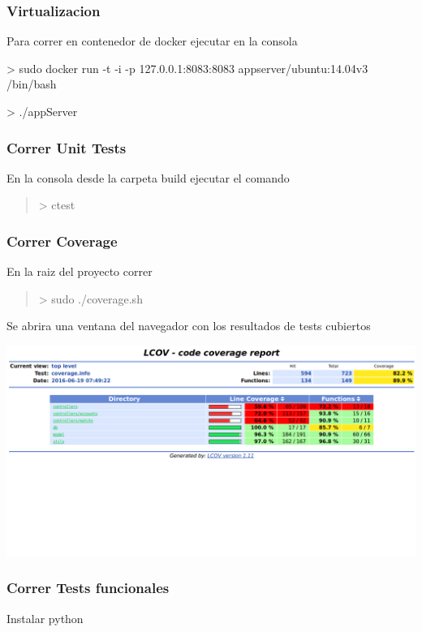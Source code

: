 \documentclass[letterpaper,10pt,english]{sphinxmanual}
\begin{document}
\subsubsection{Virtualizacion}
\label{manuals:virtualizacion}
Para correr en contenedor de docker ejecutar en la consola

\textgreater{} sudo docker run -t -i -p 127.0.0.1:8083:8083 appserver/ubuntu:14.04v3 /bin/bash

\textgreater{} ./appServer


\subsubsection{Correr Unit Tests}
\label{manuals:correr-unit-tests}
En la consola desde la carpeta build ejecutar el comando
\begin{quote}

\textgreater{} ctest
\end{quote}


\subsubsection{Correr Coverage}
\label{manuals:correr-coverage}
En la raiz del proyecto correr
\begin{quote}

\textgreater{} sudo ./coverage.sh
\end{quote}

Se abrira una ventana del navegador con los resultados de tests cubiertos

\includegraphics{coverage.png}


\subsubsection{Correr Tests funcionales}
\label{manuals:correr-tests-funcionales}
Instalar python
\end{document}
